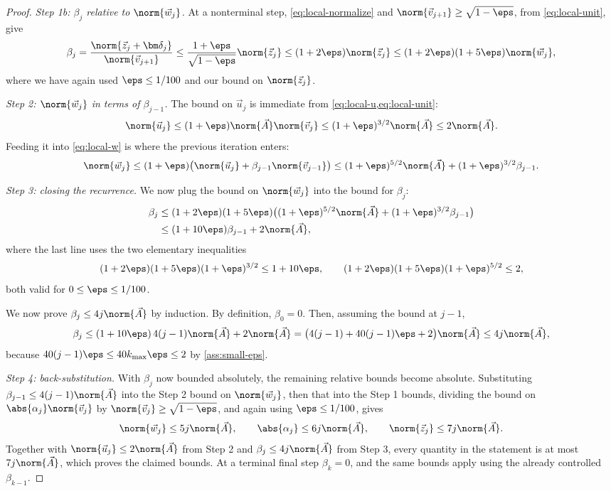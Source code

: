 \begin{proof}
\emph{Step 1b: \(\beta_j\) relative to \(\norm{\vec w_j}\).}
At a nonterminal step, \cref{eq:local-normalize} and \(\norm{\vec v_{j+1}}\ge\sqrt{1-\eps}\), from \cref{eq:local-unit}, give
\[
 \beta_j
 =\frac{\norm{\vec z_j+\bm\delta_j}}{\norm{\vec v_{j+1}}}
 \le\frac{1+\eps}{\sqrt{1-\eps}}\norm{\vec z_j}
 \le(1+2\eps)\norm{\vec z_j}
 \le (1+2\eps)(1+5\eps)\norm{\vec w_j},
\]
where we have again used \(\eps\le1/100\) and our bound on $\norm{\vec z_j}$.

\emph{Step 2: \(\norm{\vec w_j}\) in terms of \(\beta_{j-1}\).}
The bound on \(\vec u_j\) is immediate from \cref{eq:local-u,eq:local-unit}:
\[
 \norm{\vec u_j}
 \le(1+\eps)\norm{\vec A}\norm{\vec v_j}
 \le(1+\eps)^{3/2}\norm{\vec A}
 \le2\norm{\vec A}.
\]
Feeding it into \cref{eq:local-w} is where the previous iteration enters:
\[
 \norm{\vec w_j}
 \le(1+\eps)\bigl(\norm{\vec u_j}
                    +\beta_{j-1}\norm{\vec v_{j-1}}\bigr)
 \le(1+\eps)^{5/2}\norm{\vec A}+(1+\eps)^{3/2}\beta_{j-1}.
\]

\emph{Step 3: closing the recurrence.}
We now plug the bound on $\norm{\vec w_j}$ into the bound for $\beta_j$:
\[
 \begin{aligned}
  \beta_j
  &\le(1+2\eps)(1+5\eps)
       \bigl((1+\eps)^{5/2}\norm{\vec A}
             +(1+\eps)^{3/2}\beta_{j-1}\bigr)\\
  &\le(1+10\eps)\beta_{j-1}+2\norm{\vec A},
 \end{aligned}
\]
where the last line uses the two elementary inequalities
\[
 (1+2\eps)(1+5\eps)(1+\eps)^{3/2}\le1+10\eps,
 \qquad
 (1+2\eps)(1+5\eps)(1+\eps)^{5/2}\le2,
\]
both valid for \(0\le\eps\le1/100\).

We now prove \(\beta_j\le4j\norm{\vec A}\) by induction.
By definition, \(\beta_0=0\).
Then, assuming the bound at \(j-1\),
\[
 \beta_j
 \le(1+10\eps)\,4(j-1)\norm{\vec A}+2\norm{\vec A}
 =\bigl(4(j-1)+40(j-1)\eps+2\bigr)\norm{\vec A}
 \le4j\norm{\vec A},
\]
because \(40(j-1)\eps\le40k_{\max}\eps\le2\) by \cref{ass:small-eps}.

\emph{Step 4: back-substitution.}
With \(\beta_j\) now bounded absolutely, the remaining relative bounds become absolute.
Substituting \(\beta_{j-1}\le4(j-1)\norm{\vec A}\) into the Step 2 bound on \(\norm{\vec w_j}\), then that into the Step 1 bounds, dividing the bound on \(\abs{\alpha_j}\norm{\vec v_j}\) by \(\norm{\vec v_j}\ge\sqrt{1-\eps}\), and again using \(\eps\le1/100\), gives
\[
 \norm{\vec w_j}\le5j\norm{\vec A},
 \qquad
 \abs{\alpha_j}\le6j\norm{\vec A},
 \qquad
 \norm{\vec z_j}\le7j\norm{\vec A}.
\]
Together with \(\norm{\vec u_j}\le2\norm{\vec A}\) from Step 2 and \(\beta_j\le4j\norm{\vec A}\) from Step 3, every quantity in the statement is at most \(7j\norm{\vec A}\), which proves the claimed bounds.
At a terminal final step \(\beta_k=0\), and the same bounds apply using the already controlled \(\beta_{k-1}\).
\end{proof}

